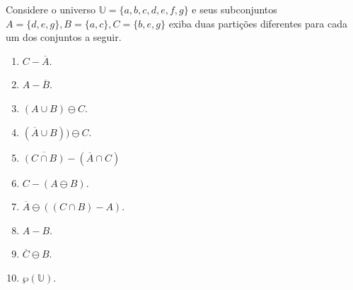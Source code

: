 \begin{exercise}\label{exerc:Conjuntos15}
	Considere o universo $\mathbb{U} = \{a, b, c, d, e, f, g\}$ e seus subconjuntos $A = \{d, e, g\}, B = \{a, c\}, C =\{b, e, g\}$ exiba duas partições diferentes para cada um dos conjuntos a seguir. 
\end{exercise}

\begin{enumerate}
	\item $C - \overline{A}$.
	\item $A - \overline{B}$.
	\item $(A \cup B) \ominus C$.
	\item $(\overline{A} \cup B)) \ominus C$.
	\item $\overline{(C \cap B)} - (\overline{A} \cap C)$
	\item $C - (A \ominus B)$.
	\item $\overline{A} \ominus ((C \cap B)  - A)$.
	\item $A - B$.
	\item $\overline{C} \ominus B$.
	\item $\wp(\mathbb{U})$.
\end{enumerate}